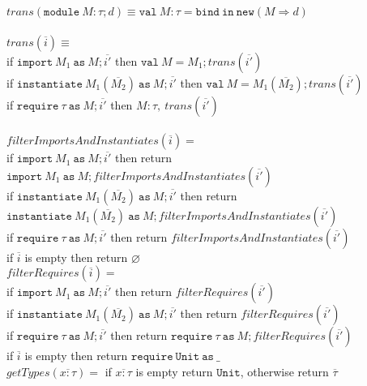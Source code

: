 \documentclass{llncs}
\newcommand{\keywadj}[1]{\mathtt{#1}}
\newcommand{\keyw}[1]{\keywadj{#1}~}
\begin{document}
\noindent$trans(\keyw{module} M : \tau; d) \equiv \keyw{val} M : \tau = \keyw{bind} \keyw{in} \keywadj{new}(M \Rightarrow d)$
\\\\
\noindent$\textit{trans}(\overline{i}) \equiv$\\
\indent if $\keyw{import} M_1~\keyw{as} M; \overline{i'}$ then $\keyw{val} M = M_1; trans(\overline{i'})$\\
\indent if $\keyw{instantiate} M_1(\overline{M_2})~\keyw{as} M; \overline{i'}$ then $ \keyw{val} M = M_1(\overline{M_2}); trans(\overline{i'})$\\
\indent if $\keyw{require} \tau~\keyw{as} M; \overline{i'}$ then $ M : \tau,~trans(\overline{i'})$\\
\\
$filterImportsAndInstantiates(\overline{i}) = $\\
\indent if $\keyw{import} M_1~\keyw{as} M; \overline{i'}$ then return $\keyw{import} M_1~\keyw{as} M; filterImportsAndInstantiates(\overline{i'})$\\
\indent if $\keyw{instantiate} M_1(\overline{M_2})~\keyw{as} M; \overline{i'}$ then return $\keyw{instantiate} M_1(\overline{M_2})~\keyw{as} M; filterImportsAndInstantiates(\overline{i'})$\\
\indent if $\keyw{require} \tau~\keyw{as} M; \overline{i'}$ then return $filterImportsAndInstantiates(\overline{i'})$\\
\indent if $\overline{i}$ is empty then return $\varnothing$ \\

\noindent$filterRequires(\overline{i}) = $\\
\indent if $\keyw{import} M_1~\keyw{as} M; \overline{i'}$ then return $filterRequires(\overline{i'})$\\
\indent if $\keyw{instantiate} M_1(\overline{M_2})~\keyw{as} M; \overline{i'}$ then return $filterRequires(\overline{i'})$\\
\indent if $\keyw{require} \tau~\keyw{as} M; \overline{i'}$ then return $\keyw{require} \tau~\keyw{as} M; filterRequires(\overline{i'})$\\
\indent if $\overline{i}$ is empty then return $\keyw{require} \keyw{Unit} \keyw{as} \_$ \\

\noindent$getTypes(\overline{x : \tau}) = $ if $\overline{x : \tau}$ is empty return $\keywadj{Unit}$, otherwise return $\overline{\tau}$\\
\end{document}
